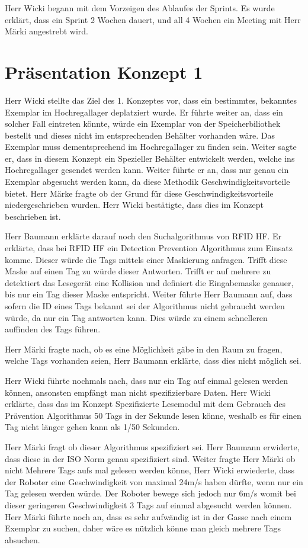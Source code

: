 \documentclass[parskip=full, a4paper]{scrreprt}
\begin{document}
Herr Wicki begann mit dem Vorzeigen des Ablaufes der Sprints.
Es wurde erklärt, dass ein Sprint 2 Wochen dauert, und all 4 Wochen ein Meeting mit Herr Märki angestrebt wird.

\chapter{Präsentation Konzept 1}

Herr Wicki stellte das Ziel des 1. Konzeptes vor, dass ein bestimmtes, bekanntes Exemplar im Hochregallager deplatziert wurde. Er führte weiter an, dass ein solcher Fall eintreten könnte, würde ein Exemplar von der Speicherbiliothek bestellt und dieses nicht im entsprechenden Behälter vorhanden wäre. Das Exemplar muss dementsprechend im Hochregallager zu finden sein.
Weiter sagte er, dass in diesem Konzept ein Spezieller Behälter entwickelt werden, welche ins Hochregallager gesendet werden kann. Weiter führte er an, dass nur genau ein Exemplar abgesucht werden kann, da diese Methodik Geschwindigkeitsvorteile bietet. Herr Märke fragte ob der Grund für diese Geschwindigkeitsvorteile niedergeschrieben wurden. Herr Wicki bestätigte, dass dies im Konzept beschrieben ist.

Herr Baumann erklärte darauf noch den Suchalgorithmus von RFID HF. Er erklärte, dass bei RFID HF ein Detection Prevention Algorithmus zum Einsatz komme. Dieser würde die Tags mittels einer Maskierung anfragen. Trifft diese Maske auf einen Tag zu würde dieser Antworten. Trifft er auf mehrere zu detektiert das Lesegerät eine Kollision und definiert die Eingabemaske genauer, bis nur ein Tag dieser Maske entspricht. Weiter führte Herr Baumann auf, dass sofern die ID eines Tags bekannt sei der Algorithmus nicht gebraucht werden würde, da nur ein Tag antworten kann. Dies würde zu einem schnelleren auffinden des Tags führen.

Herr Märki fragte nach, ob es eine Möglichkeit gäbe in den Raum zu fragen, welche Tags vorhanden seien, Herr Baumann erklärte, dass dies nicht möglich sei.

Herr Wicki führte nochmals nach, dass nur ein Tag auf einmal gelesen werden können, ansonsten empfängt man nicht spezifizierbare Daten.
Herr Wicki erklärte, dass das im Konzept Spezifizierte Lesemodul mit dem Gebrauch des Prävention Algorithmus 50 Tags in der Sekunde lesen könne, weshalb es für einen Tag nicht länger gehen kann als 1/50 Sekunden.

Herr Märki fragt ob dieser Algorithmus spezifiziert sei. Herr Baumann erwiderte, dass diese in der ISO Norm genau spezifiziert sind.
Weiter fragte Herr Märki ob nicht Mehrere Tags aufs mal gelesen werden könne, Herr Wicki erwiederte, dass der Roboter eine Geschwindigkeit von maximal 24m/s haben dürfte, wenn nur ein Tag gelesen werden würde. Der Roboter bewege sich jedoch nur 6m/s womit bei dieser geringeren Geschwindigkeit 3 Tags auf einmal abgesucht werden können.
Herr Märki führte noch an, dass es sehr aufwändig ist in der Gasse nach einem Exemplar zu suchen, daher wäre es nützlich könne man gleich mehrere Tags absuchen.
\end{document}
